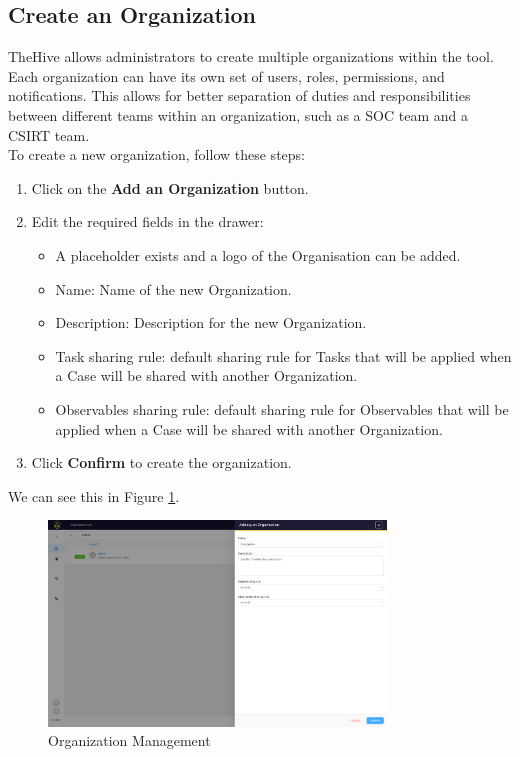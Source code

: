 \documentclass{article}
\begin{document}
\subsection{Create an Organization}
TheHive allows administrators to create multiple organizations within the tool. Each organization can have its own set of users, roles, permissions, and notifications. This allows for better separation of duties and responsibilities between different teams within an organization, such as a SOC team and a CSIRT team.\\
To create a new organization, follow these steps: \\
\begin{enumerate}
    
\item Click on the \textbf{Add an Organization} button.
\item  Edit the required fields in the drawer:
    \begin{itemize}
        \item A placeholder exists and a logo of the Organisation can be added.
        \item Name: Name of the new Organization.
        \item Description: Description for the new Organization.
        \item Task sharing rule: default sharing rule for Tasks that will be applied when a Case will be shared with another Organization.
        \item Observables sharing rule: default sharing rule for Observables that will be applied when a Case will be shared with another Organization.
    \end{itemize}
\item  Click \textbf{Confirm} to create the organization.

\end{enumerate}

We can see this in Figure \ref{fig:org}.
\begin{figure}[ht]
    \centering
    \includegraphics[width=0.8\textwidth]{organisations.png}
    \caption{Organization Management}
    \label{fig:org}
\end{figure}
\end{document}
